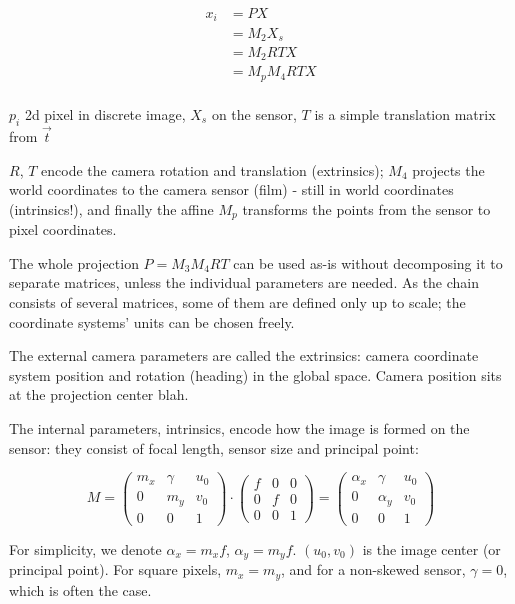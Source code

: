 \begin{align}
	x_i &= P X\\
	  &= M_2 X_s\\ %
	  &= M_2 R T X\\
	  &= M_p M_4 R T X\\ %
\end{align}

$p_i$ 2d pixel in discrete image, $X_s$ on the sensor, $T$ is a simple translation matrix from $\vec t$

$R$, $T$ encode the camera rotation and translation (extrinsics); $M_4$ projects the world coordinates to the camera sensor (film) - still in world coordinates (intrinsics!), and finally the affine $M_p$ transforms the points from the sensor to pixel coordinates.

The whole projection $P = M_3 M_4 R T$ can be used as-is without decomposing it to separate matrices, unless the individual parameters are needed. As the chain consists of several matrices, some of them are defined only up to scale; the coordinate systems' units can be chosen freely.

The external camera parameters are called the extrinsics: camera coordinate system position and rotation (heading) in the global space.
Camera position sits at the projection center blah.

The internal parameters, intrinsics, encode how the image is formed on the sensor: they consist of focal length, sensor size and principal point:

\begin{equation}
	M =
	\begin{pmatrix}
		m_x & \gamma & u_0\\
		0   &    m_y & v_0\\
		0   &        0 & 1
	\end{pmatrix}
\cdot
	\begin{pmatrix}
		f & 0 & 0\\
		0 & f & 0\\
		0 & 0 & 1
	\end{pmatrix}
	=
	\begin{pmatrix}
		\alpha_x & \gamma   & u_0\\
		0        & \alpha_y & v_0\\
		0        & 0        & 1
	\end{pmatrix}
\end{equation}

For simplicity, we denote $\alpha_x = m_x f$, $\alpha_y = m_y f$. $(u_0, v_0)$ is the image center (or principal point). For square pixels, $m_x = m_y$, and for a non-skewed sensor, $\gamma = 0$, which is often the case.

